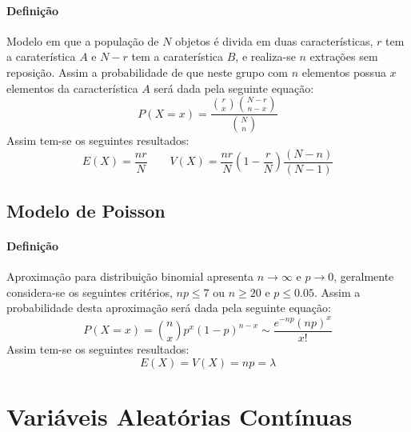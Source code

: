 \documentclass{article}
\begin{document}
            \paragraph{Definição}Modelo em que a população de $N$ objetos é divida em duas características, $r$ tem a caraterística $A$ e $N-r$ tem a caraterística $B$, e realiza-se $n$ extrações sem reposição. Assim a probabilidade de que neste grupo com $n$ elementos possua $x$ elementos da característica $A$ será dada pela seguinte equação:
                \begin{equation}
                    \boxed{
                        P(X = x) = \frac{\binom{r}{x}\binom{N-r}{n-x}}{\binom{N}{n}}
                    }
                \end{equation}
            Assim tem-se os seguintes resultados:
                \begin{equation}
                    \boxed{
                        E(X) = \frac{nr}{N}
                    }
                    \qquad
                    \boxed{
                        V(X) = \frac{nr}{N} \left(1 - \frac{r}{N}\right)\frac{(N-n)}{(N-1)}
                    }
                \end{equation}

        \subsection{Modelo de Poisson}
            \paragraph{Definição}Aproximação para distribuição binomial apresenta $n\to\infty$ e $p\to 0$, geralmente considera-se os seguintes critérios, $np\le 7$ ou $n\ge 20$ e $p\le 0.05$. Assim a probabilidade desta aproximação será dada pela seguinte equação:
                \begin{equation}
                    \boxed{
                        P(X = x) = \binom{n}{x} p^{x}(1-p)^{n-x} \sim
                        \frac{e^{-np}(np)^{x}}{x!}
                    }
                \end{equation}
            Assim tem-se os seguintes resultados:
                \begin{equation}
                    \boxed{
                        E(X) = V(X) = np = \lambda
                    }
                \end{equation}
\newpage

    \section{Variáveis Aleatórias Contínuas}
\end{document}
